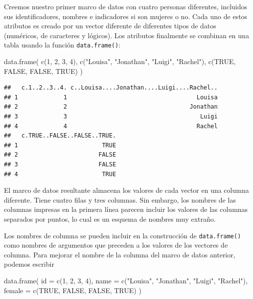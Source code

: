 \documentclass[
]{book}
\newenvironment{Shaded}{\begin{snugshade}}{\end{snugshade}}
\newcommand{\AttributeTok}[1]{\textcolor[rgb]{0.77,0.63,0.00}{#1}}
\newcommand{\ConstantTok}[1]{\textcolor[rgb]{0.00,0.00,0.00}{#1}}
\newcommand{\DecValTok}[1]{\textcolor[rgb]{0.00,0.00,0.81}{#1}}
\newcommand{\FunctionTok}[1]{\textcolor[rgb]{0.00,0.00,0.00}{#1}}
\newcommand{\NormalTok}[1]{#1}
\newcommand{\StringTok}[1]{\textcolor[rgb]{0.31,0.60,0.02}{#1}}
\begin{document}
Creemos nuestro primer marco de datos con cuatro personas diferentes, incluidos sus identificadores, nombres e indicadores si son mujeres o no. Cada uno de estos atributos es creado por un vector diferente de diferentes tipos de datos (numéricos, de caracteres y lógicos). Los atributos finalmente se combinan en una tabla usando la función \texttt{data.frame()}:

\begin{Shaded}
\begin{Highlighting}[]
\FunctionTok{data.frame}\NormalTok{(}
  \FunctionTok{c}\NormalTok{(}\DecValTok{1}\NormalTok{, }\DecValTok{2}\NormalTok{, }\DecValTok{3}\NormalTok{, }\DecValTok{4}\NormalTok{),}
  \FunctionTok{c}\NormalTok{(}\StringTok{"Louisa"}\NormalTok{, }\StringTok{"Jonathan"}\NormalTok{, }\StringTok{"Luigi"}\NormalTok{, }\StringTok{"Rachel"}\NormalTok{),}
  \FunctionTok{c}\NormalTok{(}\ConstantTok{TRUE}\NormalTok{, }\ConstantTok{FALSE}\NormalTok{, }\ConstantTok{FALSE}\NormalTok{, }\ConstantTok{TRUE}\NormalTok{)}
\NormalTok{)}
\end{Highlighting}
\end{Shaded}

\begin{verbatim}
##   c.1..2..3..4. c..Louisa....Jonathan....Luigi....Rachel..
## 1             1                                     Louisa
## 2             2                                   Jonathan
## 3             3                                      Luigi
## 4             4                                     Rachel
##   c.TRUE..FALSE..FALSE..TRUE.
## 1                        TRUE
## 2                       FALSE
## 3                       FALSE
## 4                        TRUE
\end{verbatim}

El marco de datos resultante almacena los valores de cada vector en una columna diferente. Tiene cuatro filas y tres columnas. Sin embargo, los nombres de las columnas impresas en la primera línea parecen incluir los valores de las columnas separados por puntos, lo cual es un esquema de nombres muy extraño.

Los nombres de columna se pueden incluir en la construcción de \texttt{data.frame()} como nombres de argumentos que preceden a los valores de los vectores de columna. Para mejorar el nombre de la columna del marco de datos anterior, podemos escribir

\begin{Shaded}
\begin{Highlighting}[]
\FunctionTok{data.frame}\NormalTok{(}
  \AttributeTok{id =} \FunctionTok{c}\NormalTok{(}\DecValTok{1}\NormalTok{, }\DecValTok{2}\NormalTok{, }\DecValTok{3}\NormalTok{, }\DecValTok{4}\NormalTok{),}
  \AttributeTok{name =} \FunctionTok{c}\NormalTok{(}\StringTok{"Louisa"}\NormalTok{, }\StringTok{"Jonathan"}\NormalTok{, }\StringTok{"Luigi"}\NormalTok{, }\StringTok{"Rachel"}\NormalTok{),}
  \AttributeTok{female =} \FunctionTok{c}\NormalTok{(}\ConstantTok{TRUE}\NormalTok{, }\ConstantTok{FALSE}\NormalTok{, }\ConstantTok{FALSE}\NormalTok{, }\ConstantTok{TRUE}\NormalTok{)}
\NormalTok{)}
\end{Highlighting}
\end{Shaded}
\end{document}
